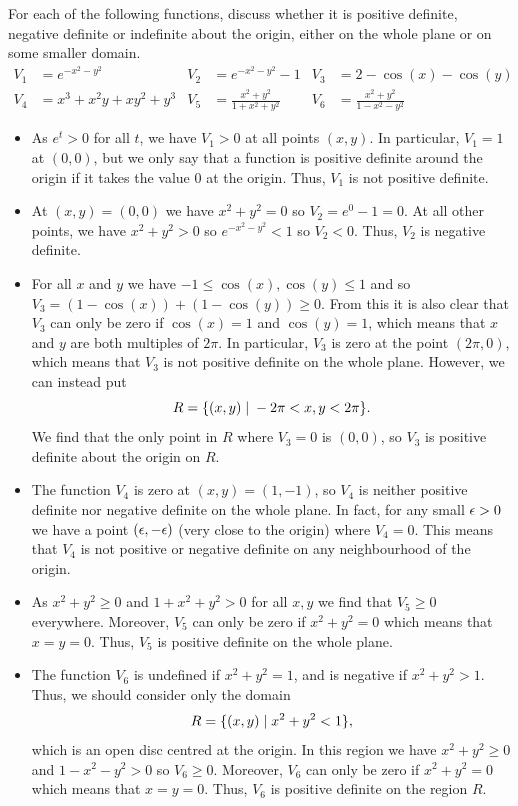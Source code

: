 \documentclass[a4paper]{amsart}
\begin{document}
\begin{exercise}\label{ex-definite}
 For each of the following functions, discuss whether it is positive
 definite, negative definite or indefinite about the origin, either on
 the whole plane or on some smaller domain.
 \begin{align*}
  V_1 &= e^{-x^2-y^2} & V_2 &= e^{-x^2-y^2}-1 & V_3 &= 2-\cos(x)-\cos(y) \\
  V_4 &= x^3+x^2y+xy^2+y^3 & V_5 &= \frac{x^2+y^2}{1+x^2+y^2} & V_6 &= \frac{x^2+y^2}{1-x^2-y^2}
 \end{align*}
\end{exercise}
\begin{solution}\leavevmode
 \begin{itemize}
  \item As $e^t>0$ for all $t$, we have $V_1>0$ at all points
   $(x,y)$.  In particular, $V_1=1$ at $(0,0)$, but we only say that a
   function is positive definite around the origin if it takes the
   value $0$ at the origin.  Thus, $V_1$ is not positive definite.
  \item At $(x,y)=(0,0)$ we have $x^2+y^2=0$ so $V_2=e^0-1=0$.  At all
   other points, we have $x^2+y^2>0$ so $e^{-x^2-y^2}<1$ so $V_2<0$.
   Thus, $V_2$ is negative definite.
  \item For all $x$ and $y$ we have $-1\leq\cos(x),\cos(y)\leq 1$ and
   so $V_3=(1-\cos(x))+(1-\cos(y))\geq 0$.  From this it is also clear
   that $V_3$ can only be zero if $\cos(x)=1$ and $\cos(y)=1$, which
   means that $x$ and $y$ are both multiples of $2\pi$.  In
   particular, $V_3$ is zero at the point $(2\pi,0)$, which means that
   $V_3$ is not positive definite on the whole plane.  However, we can
   instead put 
   \[ R = \{(x,y)\;|\; -2\pi < x,y < 2\pi\}. \]
   We find that the only point in $R$ where $V_3=0$ is $(0,0)$, so
   $V_3$ is positive definite about the origin on $R$.
  \item The function $V_4$ is zero at $(x,y)=(1,-1)$, so $V_4$ is
   neither positive definite nor negative definite on the whole
   plane.  In fact, for any small $\epsilon>0$ we have a point $(\epsilon,-\epsilon)$
   (very close to the origin) where $V_4=0$.  This means that $V_4$ is
   not positive or negative definite on any neighbourhood of the
   origin.
  \item As $x^2+y^2\geq 0$ and $1+x^2+y^2>0$ for all $x,y$ we find
   that $V_5\geq 0$ everywhere.  Moreover, $V_5$ can only be zero if
   $x^2+y^2=0$ which means that $x=y=0$.  Thus, $V_5$ is positive
   definite on the whole plane.
  \item The function $V_6$ is undefined if $x^2+y^2=1$, and is
   negative if $x^2+y^2>1$.  Thus, we should consider only the domain 
   \[ R = \{(x,y)\;|\; x^2+y^2<1\}, \]
   which is an open disc centred at the origin.  In this region we
   have $x^2+y^2\geq 0$ and $1-x^2-y^2>0$ so $V_6\geq 0$.  Moreover,
   $V_6$ can only be zero if $x^2+y^2=0$ which means that $x=y=0$.
   Thus, $V_6$ is positive definite on the region $R$.
 \end{itemize}
\end{solution}
\end{document}
